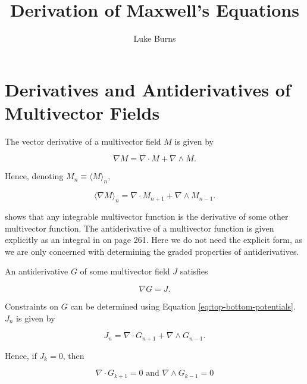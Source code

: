 \documentclass{article}
\title{Derivation of Maxwell's Equations}
\author{Luke Burns}
\begin{document}
\maketitle
{}

\section{Derivatives and Antiderivatives of Multivector Fields}

The vector derivative of a multivector field $M$ is given by

\begin{equation}
  \nabla M = \nabla \cdot M + \nabla \wedge M.
\end{equation}

Hence, denoting $M_n \equiv \langle M \rangle_n$,

\begin{equation}
  \langle \nabla M \rangle_n = \nabla \cdot M_{n+1} + \nabla \wedge M_{n-1}.\label{eq:top-bottom-potentials}
\end{equation}

\cite{cagc} shows that any integrable multivector function is the derivative of some other multivector function. The antiderivative of a multivector function is given explicitly as an integral in \cite{cagc} on page 261. Here we do not need the explicit form, as we are only concerned with determining the graded properties of antiderivatives.

An antiderivative $G$ of some multivector field $J$ satisfies

\begin{equation}
  \nabla G = J.
\end{equation}

Constraints on $G$ can be determined using Equation \ref{eq:top-bottom-potentials}. $J_n$ is given by

\begin{equation}
  J_n = \nabla \cdot G_{n+1} + \nabla \wedge G_{n-1}.\label{eq:potential-grade}
\end{equation}

Hence, if $J_k = 0$, then

\begin{equation}
  \nabla \cdot G_{k+1} = 0 \text{ and } \nabla \wedge G_{k-1} = 0\label{eq:constraints}
\end{equation}
\end{document}
